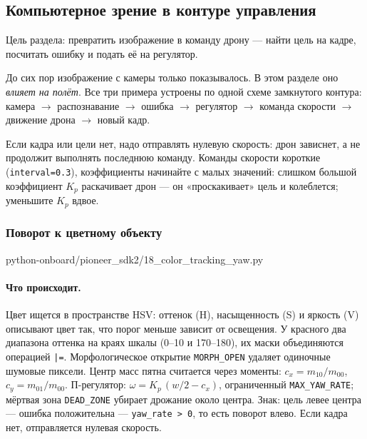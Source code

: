 \subsection{Компьютерное зрение в контуре управления}

Цель раздела: превратить изображение в команду дрону --- найти цель на кадре, посчитать ошибку и подать её на регулятор.

До сих пор изображение с камеры только показывалось. В этом разделе оно \emph{влияет на полёт}. Все три примера устроены по одной схеме замкнутого контура: камера $\to$ распознавание $\to$ ошибка $\to$ регулятор $\to$ команда скорости $\to$ движение дрона $\to$ новый кадр.



\begin{rulebox}
Если кадра или цели нет, надо отправлять нулевую скорость: дрон зависнет, а не продолжит выполнять последнюю команду. Команды скорости короткие (\verb|interval=0.3|), коэффициенты начинайте с малых значений: слишком большой коэффициент $K_p$ раскачивает дрон --- он «проскакивает» цель и колеблется; уменьшите $K_p$ вдвое.
\end{rulebox}

\subsubsection*{Поворот к цветному объекту}

\begin{codefile}[python]{python-onboard/pioneer_sdk2/18_color_tracking_yaw.py}
\end{codefile}

\paragraph{Что происходит.} Цвет ищется в пространстве HSV: оттенок (H), насыщенность (S) и яркость (V) описывают цвет так, что порог меньше зависит от освещения. У красного два диапазона оттенка на краях шкалы (0--10 и 170--180), их маски объединяются операцией \verb/|=/. Морфологическое открытие \verb|MORPH_OPEN| удаляет одиночные шумовые пиксели. Центр масс пятна считается через моменты: $c_x = m_{10}/m_{00}$, $c_y = m_{01}/m_{00}$. П-регулятор: $\omega = K_p\,(w/2 - c_x)$, ограниченный \verb|MAX_YAW_RATE|; мёртвая зона \verb|DEAD_ZONE| убирает дрожание около центра. Знак: цель левее центра --- ошибка положительна --- \verb|yaw_rate > 0|, то есть поворот влево. Если кадра нет, отправляется нулевая скорость.

